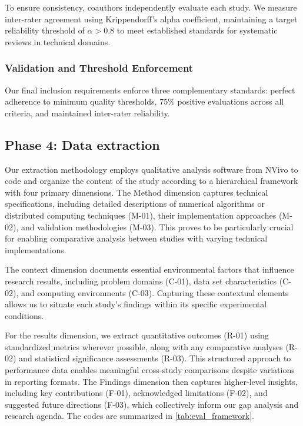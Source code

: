 \documentclass[acmsmall]{acmart}
\begin{document}
To ensure consistency, coauthors independently evaluate each study. We measure inter-rater agreement using Krippendorff's alpha coefficient, maintaining a target reliability threshold of $\alpha > 0.8$ to meet established standards for systematic reviews in technical domains.

\subsubsection{Validation and Threshold Enforcement}\label{subsubsec:phase-3-quality-assessment:validation-and-threshold-enforcement}

Our final inclusion requirements enforce three complementary standards: perfect adherence to minimum quality thresholds, 75\% positive evaluations across all criteria, and maintained inter-rater reliability.

\subsection{Phase 4: Data extraction}\label{subsec:phase-4-data-extraction}
Our extraction methodology employs qualitative analysis software from NVivo \citep{kitchenham2007guidelines} to code and organize the content of the study according to a hierarchical framework with four primary dimensions. The Method dimension captures technical specifications, including detailed descriptions of numerical algorithms or distributed computing techniques (M-01), their implementation approaches (M-02), and validation methodologies (M-03). This proves to be particularly crucial for enabling comparative analysis between studies with varying technical implementations.

The context dimension documents essential environmental factors that influence research results, including problem domains (C-01), data set characteristics (C-02), and computing environments (C-03). Capturing these contextual elements allows us to situate each study's findings within its specific experimental conditions.

For the results dimension, we extract quantitative outcomes (R-01) using standardized metrics wherever possible, along with any comparative analyses (R-02) and statistical significance assessments (R-03). This structured approach to performance data enables meaningful cross-study comparisons despite variations in reporting formats. The Findings dimension then captures higher-level insights, including key contributions (F-01), acknowledged limitations (F-02), and suggested future directions (F-03), which collectively inform our gap analysis and research agenda. The codes are summarized in \cref{tab:eval_framework}.
\end{document}
